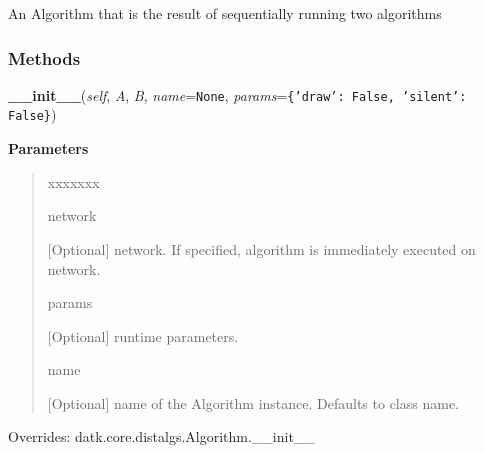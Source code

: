 An Algorithm that is the result of sequentially running two algorithms



  \subsubsection{Methods}

    \vspace{0.5ex}

\hspace{.8\funcindent}\begin{boxedminipage}{\funcwidth}

    \raggedright \textbf{\_\_init\_\_}(\textit{self}, \textit{A}, \textit{B}, \textit{name}={\tt None}, \textit{params}={\tt \texttt{\{}\texttt{'}\texttt{draw}\texttt{'}\texttt{: }False\texttt{, }\texttt{'}\texttt{silent}\texttt{'}\texttt{: }False\texttt{\}}})

\setlength{\parskip}{2ex}
\setlength{\parskip}{1ex}
      \textbf{Parameters}
      \vspace{-1ex}

      \begin{quote}
        \begin{Ventry}{xxxxxxx}

          \item[network]

          [Optional] network. If specified, algorithm is immediately 
          executed on network.

          \item[params]

          [Optional] runtime parameters.

          \item[name]

          [Optional] name of the Algorithm instance. Defaults to class 
          name.

        \end{Ventry}

      \end{quote}

      Overrides: datk.core.distalgs.Algorithm.\_\_init\_\_

    \end{boxedminipage}

